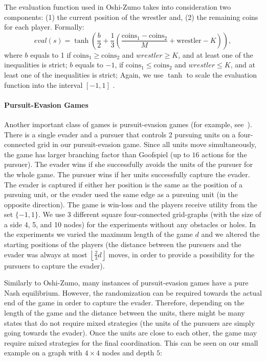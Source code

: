 \vspace{0.1cm}

The evaluation function used in Oshi-Zumo takes into consideration two components: (1) the current position of the wrestler and, (2) the remaining coins for each player. Formally:
$$
eval(s) = \tanh\left(\frac{b}{2}+\frac{1}{3}\left(\frac{\textrm{coins}_1 - \textrm{coins}_2}{M} + \textrm{wrestler} - K\right)\right),
$$
where $b$ equals to 1 if $\textrm{coins}_1 \geq \textrm{coins}_2$ and $wrestler \geq K$, and at least one of the inequalities is strict;
$b$ equals to $-1$, if $\textrm{coins}_1 \leq \textrm{coins}_2$ and $wrestler \leq K$, and at least one of the inequalities is strict;
Again, we use $\tanh$ to scale the evaluation function into the interval $[-1,1]$ .

\paragraph{\textbf{Pursuit-Evasion Games}}

Another important class of games is pursuit-evasion games (for example, see~\cite{nguyen2013monte}).
There is a single evader and a pursuer that controls 2 pursuing units on a four-connected grid in our pursuit-evasion game.
Since all units move simultaneously, the game has larger branching factor than Goofspiel (up to $16$ actions for the pursuer).
The evader wins if she successfully avoids the units of the pursuer for the whole game.
The pursuer wins if her units successfully capture the evader. 
The evader is captured if either her position is the same as the position of a pursuing unit, or the evader used the same edge as a pursuing unit (in the opposite direction).
The game is win-loss and the players receive utility from the set $\lbrace -1, 1 \rbrace$.
We use $3$ different square four-connected grid-graphs (with the size of a side 4, 5, and 10 nodes) for the experiments without any obstacles or holes.
In the experiments we varied the maximum length of the game $d$ and we altered the starting positions of the players 
(the distance between the pursuers and the evader was always at most $\left\lfloor\frac{2}{3} d\right\rfloor$ moves, in order to provide a 
possibility for the pursuers to capture the evader).

Similarly to Oshi-Zumo, many instances of pursuit-evasion games have a pure Nash equilibrium.
However, the randomization can be required towards the actual end of the game in order to capture the evader.
Therefore, depending on the length of the game and the distance between the units, there might be many states that do not require mixed
strategies (the units of the pursuers are simply going towards the evader).
Once the units are close to each other, the game may require mixed strategies for the final coordination.
This can be seen on our small example on a graph with $4\times4$ nodes and depth $5$:


